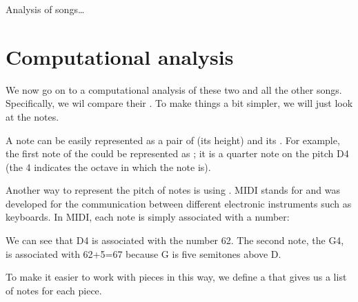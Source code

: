 \documentclass[letterpaper,10pt,english]{sphinxmanual}
\let\sphinxpxdimen\pdfpxdimen\else\newdimen\sphinxpxdimen
\begin{document}
Analysis of songs…


\section{Computational analysis}
\label{\detokenize{03_melody_I:Computational-analysis}}
We now go on to a computational analysis of these two and all the other songs. Specifically, we wil compare their . To make things a bit simpler, we will just look at the notes.

A note can be easily represented as a pair of  (its height) and its . For example, the first note of the  could be represented as ; it is a quarter note on the pitch D4 (the 4 indicates the octave in which the note is).

Another way to represent the pitch of notes is using . MIDI stands for  and was developed for the communication between different electronic instruments such as keyboards. In MIDI, each note is simply associated with a number:

\sphinxincludegraphics[width=2167\sphinxpxdimen,height=465\sphinxpxdimen]{{midi_pitch}.png} 

We can see that D4 is associated with the number 62. The second note, the G4, is associated with 62+5=67 because G is five semitones above D.

To make it easier to work with pieces in this way, we define a  that gives us a list of notes for each piece.
\end{document}
